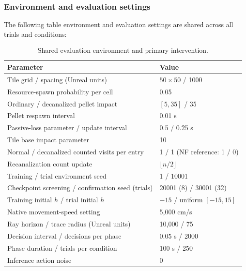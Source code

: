 \subsubsection{Environment and evaluation settings}

The following table environment and evaluation settings are shared across all trials and conditions:

\begin{table}[htbp]
\centering\small
\begin{tabularx}{\linewidth}{@{}Xl@{}}
\toprule
Parameter & Value\\
\midrule
Tile grid / spacing (Unreal units) & $50\times50$ / 1000\\
Resource-spawn probability per cell & 0.05\\
Ordinary / decanalized pellet impact & $[5,35]$ / 35\\
Pellet respawn interval & 0.01 s\\
Passive-loss parameter / update interval & 0.5 / 0.25 s\\
Tile base impact parameter & 10\\
Normal / decanalized counted visits per entry & 1 / 1 (NF reference: 1 / 0)\\
Recanalization count update & $\lfloor n/2\rfloor$\\
Training / trial environment seed & 1 / 10001\\
Checkpoint screening / confirmation seed (trials) & 20001 (8) / 30001 (32)\\
Training initial $h$ / trial initial $h$ & $-15$ / uniform $[-15,15]$\\
Native movement-speed setting & 5,000 cm/s\\
Ray horizon / trace radius (Unreal units) & 10,000 / 75\\
Decision interval / decisions per phase & 0.05 s / 2000\\
Phase duration / trials per condition & 100 s / 250\\
Inference action noise & 0\\
\bottomrule
\end{tabularx}
\caption{Shared evaluation environment and primary intervention.}
\label{tab:environment-settings}
\end{table}
